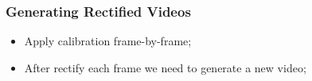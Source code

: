\documentclass{beamer}
\begin{document}
		\begin{frame}\frametitle{Generating Rectified Videos}
			\begin{itemize}
				\item Apply calibration frame-by-frame;
				\item After rectify each frame we need to generate a new video;



			 \end{itemize}
			 \begin{figure}[htb!]
				\center
				\label{fig:undistort}
			\end{figure}

		\end{frame}
\end{document}
